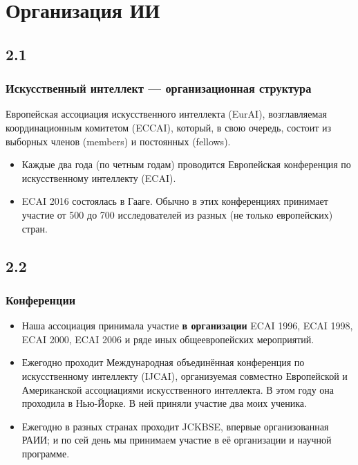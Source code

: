 \documentclass[default]{beamer}
\begin{document}
	\section{Организация ИИ}
	\subsection{2.1}
	\begin{frame}
		\frametitle{Искусственный интеллект --- организационная структура}
		
		Европейская ассоциация искусственного интеллекта  (EurAI), возглавляемая координационным 	комитетом (ECCAI), который, в свою очередь, состоит из выборных членов (members) и постоянных (fellows).
		
		\begin{itemize}
			\item Каждые два года (по четным годам) проводится Европейская конференция по искусственному интеллекту (ECAI).
			\item ECAI 2016 состоялась в Гааге. Обычно в этих конференциях принимает участие от 500 до 700 исследователей из разных (не только европейских) стран.
		\end{itemize}
	\end{frame}

	\subsection{2.2}
	\begin{frame}
		\frametitle{Конференции}
		
		\begin{itemize}
			\item Наша ассоциация принимала участие \textbf{в организации} ECAI 1996, ECAI 1998, ECAI 2000, ECAI 2006 и ряде иных общеевропейских мероприятий.
			\item Ежегодно проходит  Международная объединённая конференция по искусственному интеллекту (IJCAI), организуемая совместно Европейской и Американской ассоциациями искусственного интеллекта. В этом году она проходила в Нью-Йорке. В ней приняли участие два моих ученика.
			\item Ежегодно в разных странах проходит JCKBSE, впервые организованная РАИИ; и по сей день мы принимаем участие в её организации и научной программе.  
		\end{itemize}
	\end{frame}
\end{document}
